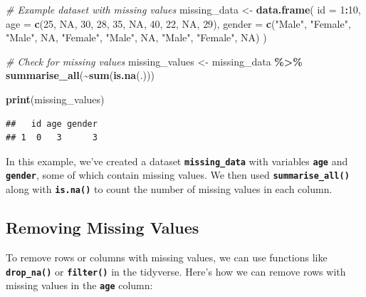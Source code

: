 \documentclass[
]{book}
\newenvironment{Shaded}{\begin{snugshade}}{\end{snugshade}}
\newcommand{\AttributeTok}[1]{\textcolor[rgb]{0.13,0.29,0.53}{#1}}
\newcommand{\CommentTok}[1]{\textcolor[rgb]{0.56,0.35,0.01}{\textit{#1}}}
\newcommand{\ConstantTok}[1]{\textcolor[rgb]{0.56,0.35,0.01}{#1}}
\newcommand{\DecValTok}[1]{\textcolor[rgb]{0.00,0.00,0.81}{#1}}
\newcommand{\FunctionTok}[1]{\textcolor[rgb]{0.13,0.29,0.53}{\textbf{#1}}}
\newcommand{\NormalTok}[1]{#1}
\newcommand{\OtherTok}[1]{\textcolor[rgb]{0.56,0.35,0.01}{#1}}
\newcommand{\SpecialCharTok}[1]{\textcolor[rgb]{0.81,0.36,0.00}{\textbf{#1}}}
\newcommand{\StringTok}[1]{\textcolor[rgb]{0.31,0.60,0.02}{#1}}
\begin{document}
\begin{Shaded}
\begin{Highlighting}[]
\CommentTok{\# Example dataset with missing values}
\NormalTok{missing\_data }\OtherTok{\textless{}{-}} \FunctionTok{data.frame}\NormalTok{(}
  \AttributeTok{id =} \DecValTok{1}\SpecialCharTok{:}\DecValTok{10}\NormalTok{,}
  \AttributeTok{age =} \FunctionTok{c}\NormalTok{(}\DecValTok{25}\NormalTok{, }\ConstantTok{NA}\NormalTok{, }\DecValTok{30}\NormalTok{, }\DecValTok{28}\NormalTok{, }\DecValTok{35}\NormalTok{, }\ConstantTok{NA}\NormalTok{, }\DecValTok{40}\NormalTok{, }\DecValTok{22}\NormalTok{, }\ConstantTok{NA}\NormalTok{, }\DecValTok{29}\NormalTok{),}
  \AttributeTok{gender =} \FunctionTok{c}\NormalTok{(}\StringTok{"Male"}\NormalTok{, }\StringTok{"Female"}\NormalTok{, }\StringTok{"Male"}\NormalTok{, }\ConstantTok{NA}\NormalTok{, }\StringTok{"Female"}\NormalTok{, }\StringTok{"Male"}\NormalTok{, }\ConstantTok{NA}\NormalTok{, }\StringTok{"Male"}\NormalTok{, }\StringTok{"Female"}\NormalTok{, }\ConstantTok{NA}\NormalTok{)}
\NormalTok{)}

\CommentTok{\# Check for missing values}
\NormalTok{missing\_values }\OtherTok{\textless{}{-}}\NormalTok{ missing\_data }\SpecialCharTok{\%\textgreater{}\%}
  \FunctionTok{summarise\_all}\NormalTok{(}\SpecialCharTok{\textasciitilde{}}\FunctionTok{sum}\NormalTok{(}\FunctionTok{is.na}\NormalTok{(.)))}

\FunctionTok{print}\NormalTok{(missing\_values)}
\end{Highlighting}
\end{Shaded}

\begin{verbatim}
##   id age gender
## 1  0   3      3
\end{verbatim}

In this example, we've created a dataset \textbf{\texttt{missing\_data}} with variables \textbf{\texttt{age}} and \textbf{\texttt{gender}}, some of which contain missing values. We then used \textbf{\texttt{summarise\_all()}} along with \textbf{\texttt{is.na()}} to count the number of missing values in each column.

\hypertarget{removing-missing-values}{%
\subsection{Removing Missing Values}\label{removing-missing-values}}

To remove rows or columns with missing values, we can use functions like \textbf{\texttt{drop\_na()}} or \textbf{\texttt{filter()}} in the tidyverse. Here's how we can remove rows with missing values in the \textbf{\texttt{age}} column:
\end{document}
